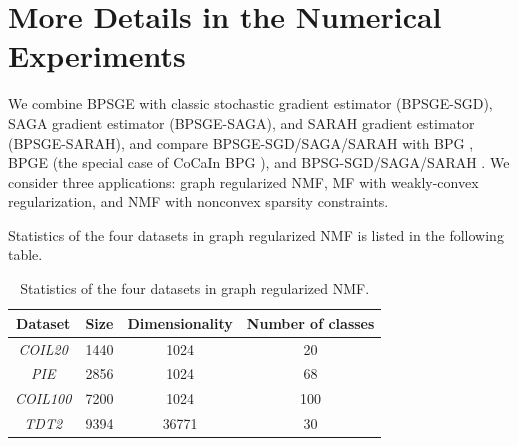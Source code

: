 \documentclass[letterpaper]{article} %
\begin{document}
	\section{More Details in the Numerical Experiments}\label{more_results}
	
	
	We combine BPSGE with classic stochastic gradient estimator \cite{RobbinsM1951} (BPSGE-SGD), SAGA gradient estimator \cite{DefazioBL14} (BPSGE-SAGA), and SARAH gradient estimator \cite{NguyenLST17} (BPSGE-SARAH), and compare BPSGE-SGD/SAGA/SARAH with BPG \cite{BolteSTV18First},   BPGE (the special case of CoCaIn BPG \cite{MukkamalaOPS20}), and BPSG-SGD/SAGA/SARAH \cite{WangH23}. We consider three applications: graph regularized NMF, MF with weakly-convex regularization, and NMF with nonconvex sparsity constraints. 
	
	
	
	Statistics of the four datasets in graph regularized NMF is listed in the following table. 
	\begin{table}[!ht]
		\centering
		\begin{tabular}{c|c|c|c}\hline
			Dataset& Size &Dimensionality     & Number of classes \\\hline
			\emph{COIL20} & 1440 & 1024 &20\\
			\emph{PIE} & 2856 &1024 & 68\\
			\emph{COIL100} & 7200 & 1024 &100\\
			\emph{TDT2} & 9394 & 36771 & 30\\\hline
		\end{tabular}
		\caption{Statistics of the four datasets in graph regularized NMF.}
		\label{GNMG_datasets}
	\end{table}
	
	
	
\end{document}
